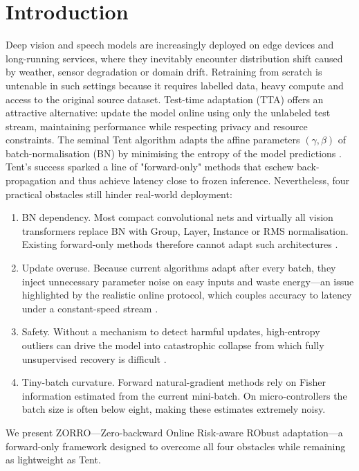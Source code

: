 \documentclass{article} %
\begin{document}
\section{Introduction}
\label{sec:intro}
Deep vision and speech models are increasingly deployed on edge devices and long-running services, where they inevitably encounter distribution shift caused by weather, sensor degradation or domain drift. Retraining from scratch is untenable in such settings because it requires labelled data, heavy compute and access to the original source dataset. Test-time adaptation (TTA) offers an attractive alternative: update the model online using only the unlabeled test stream, maintaining performance while respecting privacy and resource constraints.
The seminal Tent algorithm adapts the affine parameters \((\gamma, \beta)\) of batch-normalisation (BN) by minimising the entropy of the model predictions \cite{wang-2020-tent}. Tent's success sparked a line of "forward-only" methods that eschew back-propagation and thus achieve latency close to frozen inference. Nevertheless, four practical obstacles still hinder real-world deployment:
\begin{enumerate}
\item BN dependency. Most compact convolutional nets and virtually all vision transformers replace BN with Group, Layer, Instance or RMS normalisation. Existing forward-only methods therefore cannot adapt such architectures \cite{niu-2023-towards}.
\item Update overuse. Because current algorithms adapt after every batch, they inject unnecessary parameter noise on easy inputs and waste energy—an issue highlighted by the realistic online protocol, which couples accuracy to latency under a constant-speed stream \cite{alfarra-2023-evaluation}.
\item Safety. Without a mechanism to detect harmful updates, high-entropy outliers can drive the model into catastrophic collapse from which fully unsupervised recovery is difficult \cite{yuan-2023-robust,lee-2024-aetta}.
\item Tiny-batch curvature. Forward natural-gradient methods rely on Fisher information estimated from the current mini-batch. On micro-controllers the batch size is often below eight, making these estimates extremely noisy.
\end{enumerate}
We present ZORRO—Zero-backward Online Risk-aware RObust adaptation—a forward-only framework designed to overcome all four obstacles while remaining as lightweight as Tent.
\end{document}
